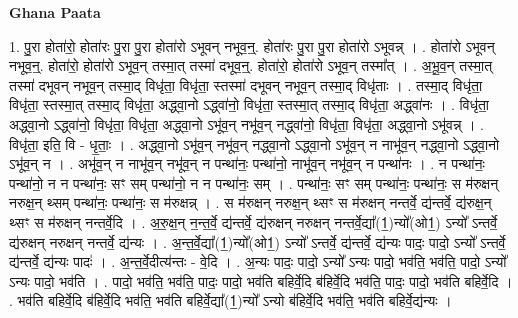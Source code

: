 \documentclass[17pt]{extarticle}
\begin{document}
\textbf{Ghana Paata } \newline

1. पु॒रा होता॑रो॒ होता॑रः पु॒रा पु॒रा होता॑रो ऽभूवन् नभूव॒न्॒. होता॑रः पु॒रा पु॒रा होता॑रो ऽभूवन्न् । . होता॑रो ऽभूवन् नभूव॒न्॒. होता॑रो॒ होता॑रो ऽभूव॒न् तस्मा॒त् तस्मा॑ दभूव॒न्॒. होता॑रो॒ होता॑रो ऽभूव॒न् तस्मा᳚त् । . अ॒भू॒व॒न् तस्मा॒त् तस्मा॑ दभूवन् नभूव॒न् तस्मा॒द् विधृ॑ता॒ विधृ॑ता॒ स्तस्मा॑ दभूवन् नभूव॒न् तस्मा॒द् विधृ॑ताः । . तस्मा॒द् विधृ॑ता॒ विधृ॑ता॒ स्तस्मा॒त् तस्मा॒द् विधृ॑ता॒ अद्ध्वा॒नो ऽद्ध्वा॑नो॒ विधृ॑ता॒ स्तस्मा॒त् तस्मा॒द् विधृ॑ता॒ अद्ध्वा॑नः । . विधृ॑ता॒ अद्ध्वा॒नो ऽद्ध्वा॑नो॒ विधृ॑ता॒ विधृ॑ता॒ अद्ध्वा॒नो ऽभू॑व॒न् नभू॑व॒न् नद्ध्वा॑नो॒ विधृ॑ता॒ विधृ॑ता॒ अद्ध्वा॒नो ऽभू॑वन्न् । . विधृ॑ता॒ इति॒ वि - धृ॒ताः॒ । . अद्ध्वा॒नो ऽभू॑व॒न् नभू॑व॒न् नद्ध्वा॒नो ऽद्ध्वा॒नो ऽभू॑व॒न् न नाभू॑व॒न् नद्ध्वा॒नो ऽद्ध्वा॒नो ऽभू॑व॒न् न । . अभू॑व॒न् न नाभू॑व॒न् नभू॑व॒न् न पन्था॑नः॒ पन्था॑नो॒ नाभू॑व॒न् नभू॑व॒न् न पन्था॑नः । . न पन्था॑नः॒ पन्था॑नो॒ न न पन्था॑नः॒ सꣳ सम् पन्था॑नो॒ न न पन्था॑नः॒ सम् । . पन्था॑नः॒ सꣳ सम् पन्था॑नः॒ पन्था॑नः॒ स म॑रुक्षन् नरुक्ष॒न् थ्सम् पन्था॑नः॒ पन्था॑नः॒ स म॑रुक्षन्न् । . स म॑रुक्षन् नरुक्ष॒न् थ्सꣳ स म॑रुक्षन् नन्तर्वे॒ द्य॑न्तर्वे॒ द्य॑रुक्ष॒न् थ्सꣳ स म॑रुक्षन् नन्तर्वे॒दि । . अ॒रु॒क्ष॒न् न॒न्त॒र्वे॒ द्य॑न्तर्वे॒ द्य॑रुक्षन् नरुक्षन् नन्तर्वे॒द्या᳚(1॒)न्यो᳚(ओ1॒) ऽन्यो᳚ ऽन्तर्वे॒ द्य॑रुक्षन् नरुक्षन् नन्तर्वे॒ द्य॑न्यः । . अ॒न्त॒र्वे॒द्या᳚(1॒)न्यो᳚(ओ1॒) ऽन्यो᳚ ऽन्तर्वे॒ द्य॑न्तर्वे॒ द्य॑न्यः पादः॒ पादो॒ ऽन्यो᳚ ऽन्तर्वे॒ द्य॑न्तर्वे॒ द्य॑न्यः पादः॑ । . अ॒न्त॒र्वे॒दीत्य॑न्तः - वे॒दि । . अ॒न्यः पादः॒ पादो॒ ऽन्यो᳚ ऽन्यः पादो॒ भव॑ति॒ भव॑ति॒ पादो॒ ऽन्यो᳚ ऽन्यः पादो॒ भव॑ति । . पादो॒ भव॑ति॒ भव॑ति॒ पादः॒ पादो॒ भव॑ति बहिर्वे॒दि ब॑हिर्वे॒दि भव॑ति॒ पादः॒ पादो॒ भव॑ति बहिर्वे॒दि । . भव॑ति बहिर्वे॒दि ब॑हिर्वे॒दि भव॑ति॒ भव॑ति बहिर्वे॒द्या᳚(1॒)न्यो᳚ ऽन्यो ब॑हिर्वे॒दि भव॑ति॒ भव॑ति बहिर्वे॒द्य॑न्यः । \newline
\end{document}
